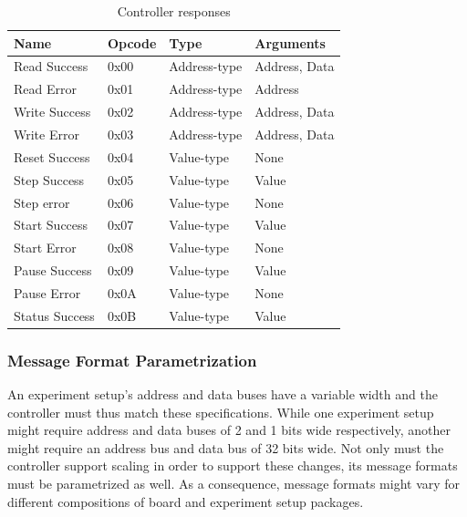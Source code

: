 \documentclass[main.tex]{subfiles}
\begin{document}
\begin{table}[h]
    \footnotesize       
    \caption{Controller responses}
    \label{tbl:opcodes-res}
    \centering
    \begin{tabular}{|l|l|l|l|}
        \hline
        \textbf{Name}  & \textbf{Opcode} & \textbf{Type}  & \textbf{Arguments}  \\ \hline
        Read Success   & 0x00            & Address-type   & Address, Data       \\
        Read Error     & 0x01            & Address-type   & Address             \\
        Write Success  & 0x02            & Address-type   & Address, Data       \\
        Write Error    & 0x03            & Address-type   & Address, Data       \\
        Reset Success  & 0x04            & Value-type     & None                \\
        Step Success   & 0x05            & Value-type     & Value               \\
        Step error     & 0x06            & Value-type     & None                \\
        Start Success  & 0x07            & Value-type     & Value               \\
        Start Error    & 0x08            & Value-type     & None                \\
        Pause Success  & 0x09            & Value-type     & Value               \\
        Pause Error    & 0x0A            & Value-type     & None                \\
        Status Success & 0x0B            & Value-type     & Value               \\ \hline
    \end{tabular}
\end{table}

\subsubsection{Message Format Parametrization}

An experiment setup's address and data buses have a variable width and the controller must thus match these specifications. While one experiment setup might require address and data buses of 2 and 1 bits wide respectively, another might require an address bus and data bus of 32 bits wide. Not only must the controller support scaling in order to support these changes, its message formats must be parametrized as well. As a consequence, message formats might vary for different compositions of board and experiment setup packages. 
\end{document}
